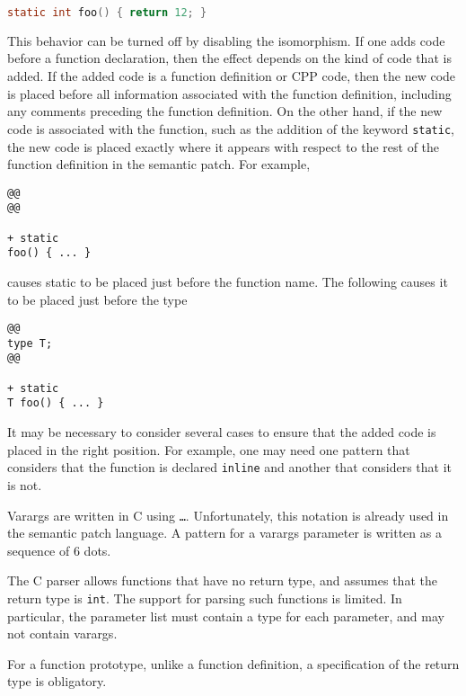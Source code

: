 \begin{lstlisting}[language=C]
static int foo() { return 12; }
\end{lstlisting}

\noindent
This behavior can be turned off by disabling the 
isomorphism.  If one adds code before a function declaration, then the
effect depends on the kind of code that is added.  If the added code is a
function definition or CPP code, then the new code is placed before
all information associated with the function definition, including any
comments preceding the function definition.  On the other hand, if the new
code is associated with the function, such as the addition of the keyword
{\tt static}, the new code is placed exactly where it appears with respect
to the rest of the function definition in the semantic patch.  For example,

\begin{lstlisting}[language=Cocci]
@@
@@

+ static
foo() { ... }
\end{lstlisting}

\noindent
causes static to be placed just before the function name.  The following
causes it to be placed just before the type

\begin{lstlisting}[language=Cocci]
@@
type T;
@@

+ static
T foo() { ... }
\end{lstlisting}

\noindent
It may be necessary to consider several cases to ensure that the added code
is placed in the right position.  For example, one may need one pattern
that considers that the function is declared {\tt inline} and another that
considers that it is not.

Varargs are written in C using {\tt \ldots}.  Unfortunately, this notation
is already used in the semantic patch language.  A pattern for a varargs
parameter is written as a sequence of 6 dots.

The C parser allows functions that have no return type, and assumes that
the return type is \texttt{int}.  The support for parsing such functions is
limited.  In particular, the parameter list must contain a type for each
parameter, and may not contain varargs.

For a function prototype, unlike a function definition, a specification of
the return type is obligatory.


